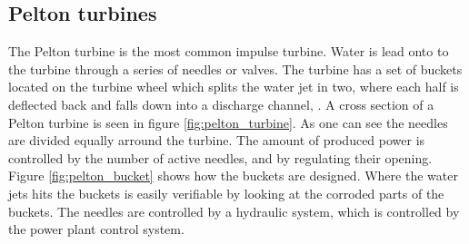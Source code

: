     
    
    \subsection{Pelton turbines}\label{subsec:pelton}
        
        The Pelton turbine is the most common impulse turbine. Water is lead onto to the turbine through a series of needles or valves. The turbine has a set of buckets located on the turbine wheel which splits the water jet in two, where each half is deflected back and falls down into a discharge channel, \cite{Paish2002}. A cross section of a Pelton turbine is seen in figure \ref{fig:pelton_turbine}. As one can see the needles are divided equally arround the turbine. The amount of produced power is controlled by the number of active needles, and by regulating their opening. Figure \ref{fig:pelton_bucket} shows how the buckets are designed. Where the water jets hits the buckets is easily verifiable by looking at the corroded parts of the buckets. The needles are controlled by a hydraulic system, which is controlled by the power plant control system. 
        
